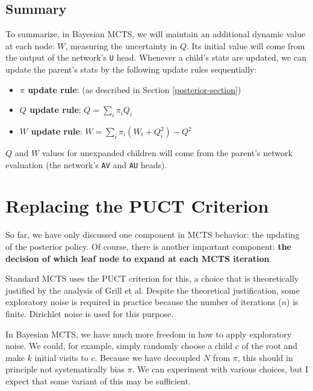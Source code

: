 \documentclass[tikz]{article}
\begin{document}
\subsection{Summary}

To summarize, in Bayesian MCTS, we will maintain an additional dynamic value at each node: $W$, measuring the uncertainty in $Q$.
Its initial value will come from the output of the network's \texttt{U} head.
Whenever a child's stats are updated, we can update the parent's stats by the following update rules sequentially:

\begin{itemize}
    \item \textbf{$\pi$ update rule}: (as described in Section \ref{posterior-section})
    \item \textbf{$Q$ update rule}: $Q = \sum_i \pi_i Q_i$
    \item \textbf{$W$ update rule}: $W = \sum_i \pi_i(W_i+Q_i^2) - Q^2$
\end{itemize}

$Q$ and $W$ values for unexpanded children will come from the parent's network evaluation (the network's \texttt{AV} and \texttt{AU} heads).

\newpage 

\section{Replacing the PUCT Criterion}

So far, we have only discussed one component in MCTS behavior: the updating of the posterior policy. Of course, there is another
important component: \textbf{the decision of which leaf node to expand at each MCTS iteration}. \newline

Standard MCTS uses the PUCT criterion for this, a choice that is theoretically justified by the analysis of Grill et al. Despite the
theoretical justification, some exploratory noise is required in practice because the number of iterations ($n$) is finite. Dirichlet
noise is used for this purpose. \newline

In Bayesian MCTS, we have much more freedom in how to apply exploratory noise. We could, for example, simply randomly choose a child $c$ of
the root and make $k$ initial visits to $c$. Because we have decoupled $N$ from $\pi$, this should in principle not systematically bias $\pi$. We can
experiment with various choices, but I expect that some variant of this may be sufficient.\newline
\end{document}
